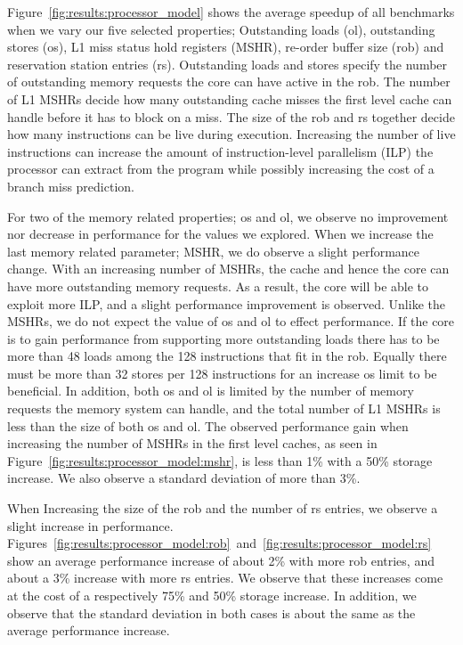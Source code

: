 Figure~\ref{fig:results:processor_model} shows the average speedup of all benchmarks when we vary our five selected properties; Outstanding loads (ol), outstanding stores (os), L1 miss status hold registers (MSHR), re-order buffer size (rob) and reservation station entries (rs).
Outstanding loads and stores specify the number of outstanding memory requests the core can have active in the rob.
The number of L1 MSHRs decide how many outstanding cache misses the first level cache can handle before it has to block on a miss.
The size of the rob and rs together decide how many instructions can be live during execution.  
Increasing the number of live instructions can increase the amount of instruction-level parallelism (ILP) the processor can extract from the program while possibly increasing the cost of a branch miss prediction.

For two of the memory related properties; os and ol, we observe no improvement nor decrease in performance for the values we explored.
When we increase the last memory related parameter; MSHR, we do observe a slight performance change.
With an increasing number of MSHRs, the cache and hence the core can have more outstanding memory requests. 
As a result, the core will be able to exploit more ILP, and a slight performance improvement is observed. 
Unlike the MSHRs, we do not expect the value of os and ol to effect performance. 
If the core is to gain performance from supporting more outstanding loads there has to be more than 48 loads among the 128 instructions that fit in the rob. 
Equally there must be more than 32 stores per 128 instructions for an increase os limit to be beneficial.
In addition, both os and ol is limited by the number of memory requests the memory system can handle, and the total number of L1 MSHRs is less than the size of both os and ol.
The observed performance gain when increasing the number of MSHRs in the first level caches, as seen in Figure~\ref{fig:results:processor_model:mshr}, is less than 1\% with a 50\% storage increase. 
We also observe a standard deviation of more than 3\%. 

When Increasing the size of the rob and the number of rs entries, we observe a slight increase in performance.
Figures~\ref{fig:results:processor_model:rob}~and~\ref{fig:results:processor_model:rs} show an average performance increase of about 2\% with more rob entries, and about a 3\% increase with more rs entries.
We observe that these increases come at the cost of a respectively 75\% and 50\% storage increase.
In addition, we observe that the standard deviation in both cases is about the same as the average performance increase.

